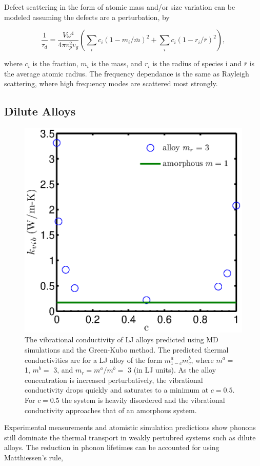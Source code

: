 \documentclass[letterpaper,12pt]{article}
\begin{document}
Defect scattering in the form of atomic mass and/or size variation can be modeled assuming the defects are a perturbation, by

\begin{equation}\label{EQ:M:tau_d}
\frac{1}{\tau_{d}} = \frac{V \omega^4}{4 \pi v_p^2 v_g} ( \sum_i c_i(1-m_i/\bar m)^2 + \sum_i c_i(1-r_i/\bar r)^2 ),
\end{equation}

where $c_i$ is the fraction, $m_i$ is the mass, and $r_i$ is the radius of species i and $\bar r$ is the average atomic radius.\cite{klemens1955,klemens1957} The frequency dependance is the same as Rayleigh scattering, where high frequency modes are scattered most strongly. 

\subsection{\label{S-Prelim-Dilute-Alloys}Dilute Alloys}
\begin{figure}
\begin{center}
\includegraphics[scale=0.6]{LJ_alloy_GK.eps}
\vspace*{-5mm}
\end{center}
\caption{\label{FIG:LJ_alloy_GK} The vibrational conductivity of LJ alloys predicted using MD simulations and the Green-Kubo method. The predicted thermal conductivities are for a LJ alloy of the form $m^a_{1-c}m^b_{c}$, where $m^a =$ 1, $m^b=$ 3, and $m_r = m^a/m^b=$ 3 (in LJ units).  As the alloy concentration is increased perturbatively, the vibrational conductivity drops quickly and saturates to a minimum at $c=0.5$. For $c=0.5$ the system is heavily disordered and the vibrational conductivity approaches that of an amorphous system.}
\end{figure}
Experimental measurements\cite{PhysRevB.71.235202} and atomistic simulation predictions\cite{shiomi2011a} show phonons still dominate the thermal transport in weakly pertubred systems such as dilute alloys.\cite{callaway1959} The reduction in phonon lifetimes can be accounted for using Matthiessen's rule,
\end{document}
